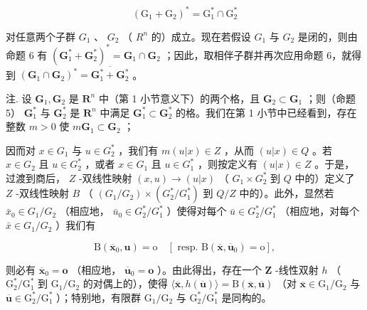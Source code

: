 \[
(\mathrm{G} _ {1} + \mathrm{G} _ {2}) ^ {*} = \mathrm{G} _ {1} ^ {*} \cap \mathrm{G} _ {2} ^ {*}
\]

对任意两个子群 \(G_{1}\) 、 \(G_{2}\) （ \(R^{n}\) 的）成立。现在若假设 \(G_{1}\) 与 \(G_{2}\) 是闭的，则由命题 6 有 \((\mathbf{G}_{1}^{*} + \mathbf{G}_{2}^{*})^{*} = \mathbf{G}_{1} \cap \mathbf{G}_{2}\) ；因此，取相伴子群并再次应用命题 6，就得到 \((\mathbf{G}_{1} \cap \mathbf{G}_{2})^{*} = \overline{\mathbf{G}_{1}^{*} + \mathbf{G}_{2}^{*}}\) 。

注. 设 \(\mathbf{G}_1, \mathbf{G}_2\) 是 \(\mathbf{R}^n\) 中（第 1 小节意义下）的两个格，且 \(\mathbf{G}_2 \subset \mathbf{G}_1\) ；则（命题 5） \(\mathbf{G}_1^*\) 与 \(\mathbf{G}_2^*\) 是 \(\mathbf{R}^n\) 中满足 \(\mathbf{G}_1^* \subset \mathbf{G}_2^*\) 的格。我们在第 1 小节中已经看到，存在整数 \(m > 0\) 使 \(m\mathbf{G}_1 \subset \mathbf{G}_2\) ；

因而对 \(x \in G_1\) 与 \(u \in G_2^*\) ，我们有 \(m(u|x) \in Z\) ，从而 \((u|x) \in Q\) 。若 \(x \in G_2\) 且 \(u \in G_2^*\) ，或者 \(x \in G_1\) 且 \(u \in G_1^*\) ，则按定义有 \((u|x) \in Z\) 。于是，过渡到商后， \(Z\) -双线性映射 \((x, u) \to (u|x)\) （ \(G_1 \times G_2^*\) 到 \(Q\) 中的）定义了 \(Z\) -双线性映射 \(B\) （ \((G_1/G_2) \times (G_2^*/G_1^*)\) 到 \(Q/Z\) 中的）。此外，显然若 \(\bar{x}_0 \in G_1/G_2\) （相应地， \(\bar{u}_0 \in G_2^*/G_1^*\) ）使得对每个 \(\bar{u} \in G_2^*/G_1^*\) （相应地，对每个 \(\bar{x} \in G_1/G_2\) ）我们有

\[
\mathrm{B} (\overline {{{\boldsymbol {x}}}} _ {0}, \boldsymbol {u}) = \mathrm{o} \quad [ \text { resp. } \mathrm{B} (\overline {{{\boldsymbol {x}}}}, \overline {{{\boldsymbol {u}}}} _ {0}) = \mathrm{o} ],
\]

则必有 \(\overline{\mathbf{x}}_0 = \mathbf{o}\) （相应地， \(\overline{\mathbf{u}}_0 = \mathbf{o}\) ）。由此得出，存在一个 \(\mathbf{Z}\) -线性双射 \(h\) （ \(\mathrm{G}_2^* / \mathrm{G}_1^*\) 到 \(\mathrm{G}_1 / \mathrm{G}_2\) 的对偶上的），使得 \(\langle \overline{\mathbf{x}}, h(\overline{\mathbf{u}}) \rangle = \mathrm{B}(\overline{\mathbf{x}}, \overline{\mathbf{u}})\) （对 \(\overline{\mathbf{x}} \in \mathrm{G}_1 / \mathrm{G}_2\) 与 \(\overline{\mathbf{u}} \in \mathrm{G}_2^* / \mathrm{G}_1^*\) ）；特别地，有限群 \(\mathrm{G}_1 / \mathrm{G}_2\) 与 \(\mathrm{G}_2^* / \mathrm{G}_1^*\) 是同构的。

